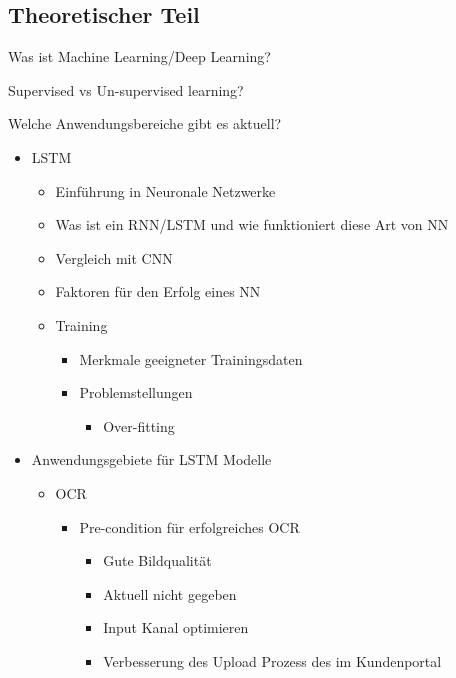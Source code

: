 \documentclass{hwz}
\begin{document}
	
\subsection{Theoretischer Teil}
Was ist Machine Learning/Deep Learning?

Supervised vs Un-supervised learning?

Welche Anwendungsbereiche gibt es aktuell?

\begin{itemize}
    \item LSTM
    \begin{itemize}
        \item Einführung in Neuronale Netzwerke
        \item Was ist ein RNN/LSTM und wie funktioniert diese Art von NN
        \item Vergleich mit CNN
        \item Faktoren für den Erfolg eines NN
        \item Training
        \begin{itemize}
            \item Merkmale geeigneter Trainingsdaten
            \item Problemstellungen
            \begin{itemize}
                \item Over-fitting
            \end{itemize}
        \end{itemize}
        \end{itemize}
		\item Anwendungsgebiete für LSTM Modelle
        \begin{itemize}
	        \item OCR
            \begin{itemize}
			    \item Pre-condition für erfolgreiches OCR
                \begin{itemize}
				    \item Gute Bildqualität
					    \item Aktuell nicht gegeben
						\item Input Kanal optimieren
							\item Verbesserung des Upload Prozess des im Kundenportal

\end{itemize}
\end{itemize}
\end{itemize}
\end{itemize}
\end{document}

